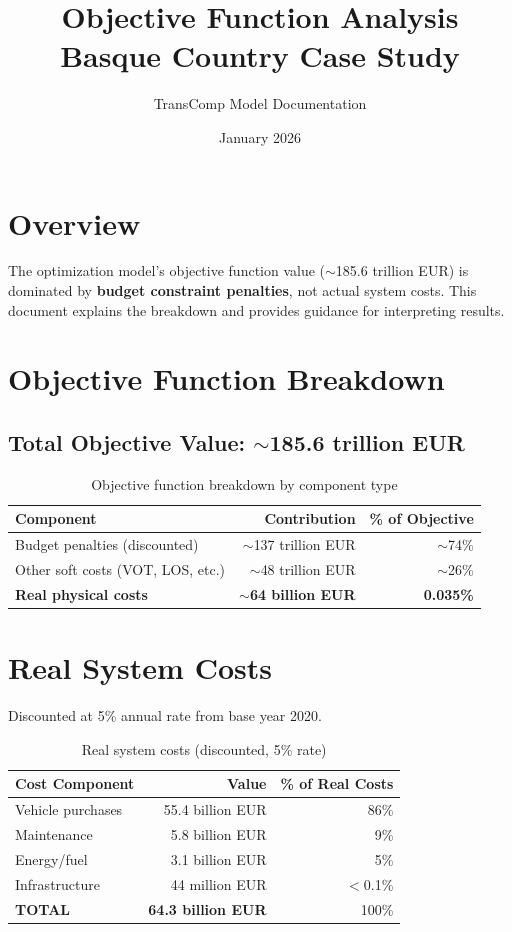 \documentclass[11pt,a4paper]{article}
\title{Objective Function Analysis\\Basque Country Case Study}
\author{TransComp Model Documentation}
\date{January 2026}
\begin{document}
\maketitle

\section{Overview}

The optimization model's objective function value ($\sim$185.6 trillion EUR) is dominated by \textbf{budget constraint penalties}, not actual system costs. This document explains the breakdown and provides guidance for interpreting results.

\section{Objective Function Breakdown}

\subsection{Total Objective Value: $\sim$185.6 trillion EUR}

\begin{table}[h]
\centering
\begin{tabular}{lrr}
\toprule
\textbf{Component} & \textbf{Contribution} & \textbf{\% of Objective} \\
\midrule
Budget penalties (discounted) & $\sim$137 trillion EUR & $\sim$74\% \\
Other soft costs (VOT, LOS, etc.) & $\sim$48 trillion EUR & $\sim$26\% \\
\textbf{Real physical costs} & \textbf{$\sim$64 billion EUR} & \textbf{0.035\%} \\
\bottomrule
\end{tabular}
\caption{Objective function breakdown by component type}
\end{table}

\section{Real System Costs}

Discounted at 5\% annual rate from base year 2020.

\begin{table}[h]
\centering
\begin{tabular}{lrr}
\toprule
\textbf{Cost Component} & \textbf{Value} & \textbf{\% of Real Costs} \\
\midrule
Vehicle purchases & 55.4 billion EUR & 86\% \\
Maintenance & 5.8 billion EUR & 9\% \\
Energy/fuel & 3.1 billion EUR & 5\% \\
Infrastructure & 44 million EUR & $<$0.1\% \\
\midrule
\textbf{TOTAL} & \textbf{64.3 billion EUR} & 100\% \\
\bottomrule
\end{tabular}
\caption{Real system costs (discounted, 5\% rate)}
\end{table}
\end{document}
